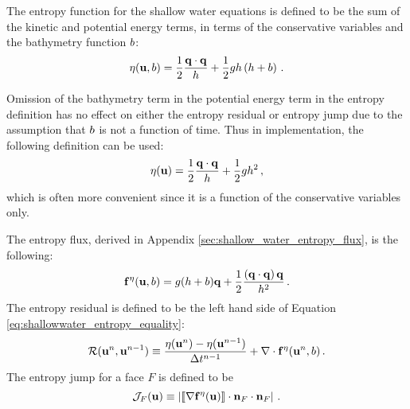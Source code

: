 The entropy function for the shallow water equations is defined to be
the sum of the kinetic and potential energy terms, in terms of the
conservative variables and the bathymetry function $b$:
\begin{equation}
  \eta(\mathbf{u},b)
  = \frac{1}{2}\frac{\mathbf{q}\cdot\mathbf{q}}
  {h} + \frac{1}{2}gh\left(h+b\right)
  \,.
\end{equation}
\begin{remark}
Omission of the bathymetry term in the potential energy
term in the entropy definition has no effect on either the entropy
residual or entropy jump due to the assumption that $b$ is
not a function of time. Thus in implementation, the following definition
can be used:
\begin{equation}
  \eta(\mathbf{u})
  = \frac{1}{2}\frac{\mathbf{q}\cdot\mathbf{q}}
  {h} + \frac{1}{2}gh^2
  \,,
\end{equation}
which is often more convenient since it is a function of the conservative
variables only.
\end{remark}
The entropy flux, derived in Appendix \ref{sec:shallow_water_entropy_flux}, is the
following:
\begin{equation}
  \mathbf{f}^\eta(\mathbf{u},b)
  = g(h + b)\mathbf{q}
  + \frac{1}{2}\frac{\left(\mathbf{q}\cdot\mathbf{q}\right)\mathbf{q}} 
  {h^2}
  \,.
\end{equation}
The entropy residual is defined to be the left hand side of 
Equation \eqref{eq:shallowwater_entropy_equality}:
\begin{equation}
  \mathcal{R}(\mathbf{u}^n, \mathbf{u}^{n-1})
    \equiv \frac{\eta(\mathbf{u}^n)
      - \eta(\mathbf{u}^{n-1})}{\Delta t^{n-1}}
    + \nabla\cdot\mathbf{f}^\eta
      (\mathbf{u}^n,b)
  \,.
\end{equation}
The entropy jump for a face $F$ is defined to be
\begin{equation}
  \mathcal{J}_F(\mathbf{u})
  \equiv \left|
    \left\llbracket\nabla\mathbf{f}^\eta(\mathbf{u})\right\rrbracket
    \cdot\mathbf{n}_F\cdot\mathbf{n}_F
  \right| \,.
\end{equation}
